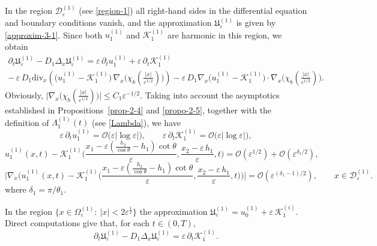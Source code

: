 \documentclass[reqno]{amsart}            %
\numberwithin{equation}{section}
\begin{document}
	In the region $\mathcal{D}^{(1)}_{\varepsilon}$ (see \eqref{region-1})
	all right-hand sides in the differential equation and boundary conditions vanish, and the approximation $\mathfrak{U}_\varepsilon^{(1)}$ is given by \eqref{approxim-3-1}. Since both $u_1^{(1)}$ and $\mathcal{K}_1^{(1)}$ are harmonic in this region, we obtain 
	\begin{multline}\label{res-reg-1}
		\partial_t \mathfrak{U}_\varepsilon^{(1)} - D_1 \Delta_x \mathfrak{U}_\varepsilon^{(1)}  = \varepsilon \, \partial_t u_1^{(1)}  + \varepsilon\, \partial_t\mathcal{K}_1^{(1)}
		\\
		-\, \varepsilon \, D_1 \mathrm{div}_x\left(\big(u_1^{(1)} - \mathcal{K}_1^{(1)}\big) \, \nabla_x\big(\chi_b(\tfrac{|x|}{\varepsilon^{1/2}})\big)\right)
		- \varepsilon \, D_1  \nabla_x\big(u_1^{(1)} - \mathcal{K}_1^{(1)}\big)\cdot\nabla_x\big(\chi_b(\tfrac{|x|}{\varepsilon^{1/2}})\big).
	\end{multline}
	Obviously, $\big|\nabla_x \big(\chi_b(\frac{|x|}{\varepsilon^{1/2}})\big)\big| \le C_1 \varepsilon^{-1/2}.$ Taking into account 
	the asymptotics established in Propositions~\ref{prop-2-4} and \ref{propo-2-5}, together with the definition of $\Lambda^{(1)}_1(t)$ (see \eqref{Lambda}), we have
	\begin{equation}\label{as-est-1}
		\varepsilon \, \partial_t u_1^{(1)} = \mathcal{O}\big(\varepsilon|\log\varepsilon|\big), \qquad \varepsilon\, \partial_t\mathcal{K}_1^{(1)} = \mathcal{O}\big(\varepsilon|\log\varepsilon|\big),
	\end{equation}
	\begin{equation}\label{as-est-2}
		u_1^{(1)}(x,t) - \mathcal{K}^{(1)}_1\Big(\frac{x_1 - \varepsilon (\frac{h_2}{\cos \theta} - h_1) \cot\theta}{\varepsilon}, \frac{x_2 - \varepsilon \, h_1}{\varepsilon}, t\Big) = \mathcal{O}(\varepsilon^{1/2}) + \mathcal{O}(\varepsilon^{\delta_1/2}), 
	\end{equation}
	\begin{equation}\label{as-est-3}
		\Big|\nabla_x\Big(u^{(1)}_1(x,t) - \mathcal{K}^{(1)}_1\Big(\frac{x_1 - \varepsilon (\frac{h_2}{\cos \theta} - h_1) \cot\theta}{\varepsilon}, \frac{x_2 - \varepsilon \, h_1}{\varepsilon}, t\Big)\Big)\Big|
		= \mathcal{O}\!\left(\varepsilon^{(\delta_1-1)/2}\right), \qquad x\in\mathcal{D}^{(1)}_\varepsilon.
	\end{equation}
	where $\delta_1 = \pi/\theta_1.$
	
	
	In the region $\{x\in \Omega_\varepsilon^{(1)} \colon \ |x| < 2 \varepsilon^{\frac12}\}$ the approximation $\mathfrak{U}_\varepsilon^{(1)} = u_0^{(1)} + \varepsilon \, \mathcal{K}^{(i)}_1.$ Direct computations give that, for each $t\in (0,T),$
	\begin{equation}\label{as-est-4}
		\partial_t \mathfrak{U}_\varepsilon^{(1)} - D_1 \Delta_x \mathfrak{U}_\varepsilon^{(1)}  =  \varepsilon\, \partial_t\mathcal{K}_1^{(1)}.
	\end{equation}
	
\end{document}
